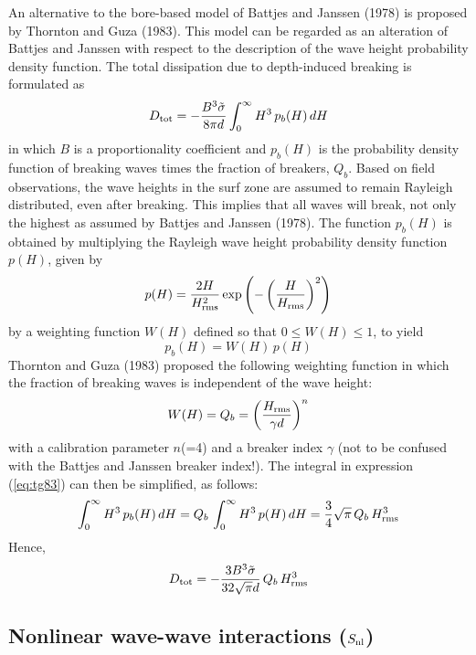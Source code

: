 \documentclass[12pt]{book}
\begin{document}
\noindent
An alternative to the bore-based model of Battjes and Janssen (1978) is proposed by Thornton and Guza (1983).
This model can be regarded as an alteration of Battjes and Janssen with respect to the description of the wave
height probability density function. The total dissipation due to depth-induced breaking is formulated as
\begin{equation}
  D_{\rm tot} = - \frac{B^3 \tilde{\sigma}}{8 \pi d} \int_{0}^{\infty} H^3 \, p_b(H)\,dH
  \label{eq:tg83}
\end{equation}
in which $B$ is a proportionality coefficient and $p_b(H)$ is the probability density function of breaking
waves times the fraction of breakers, $Q_b$. Based on field observations, the wave heights in the surf zone
are assumed to remain Rayleigh distributed, even after breaking. This implies that all waves will break, not
only the highest as assumed by Battjes and Janssen (1978). The function $p_b(H)$ is obtained by multiplying
the Rayleigh wave height probability density function $p(H)$, given by
\begin{equation}
  p(H) = \frac{2H}{H^2_{\rm rms}}\exp \left( - \left( \frac{H}{H_{\rm rms}} \right)^2 \right)
\end{equation}
by a weighting function $W(H)$ defined so that $0 \leq W(H) \leq 1$, to yield
\begin{equation}
  p_b(H) = W(H)\,p(H)
\end{equation}
Thornton and Guza (1983) proposed the following weighting function in which the fraction of breaking waves
is independent of the wave height:
\begin{equation}
  W(H) = Q_b = \left( \frac{H_{\rm rms}}{\gamma d} \right)^n
\end{equation}
with a calibration parameter $n$(=4) and a breaker index $\gamma$ (not to be confused with the Battjes and Janssen breaker index!).
The integral in expression (\ref{eq:tg83}) can then be simplified, as follows:
\begin{equation}
  \int_{0}^{\infty} H^3 \, p_b(H)\,dH = Q_b\,\int_{0}^{\infty} H^3 \, p(H)\,dH = \frac{3}{4}\sqrt{\pi}\,Q_b\,H^3_{\rm rms}
\end{equation}
Hence,
\begin{equation}
  D_{\rm tot} = - \frac{3 B^3 \tilde{\sigma}}{32 \sqrt{\pi} d} \, Q_b\, H^3_{\rm rms}
  \label{eq:tg83_2}
\end{equation}

\subsection{Nonlinear wave-wave interactions ($S_{\rm nl}$)} \label{sec:waveint}
\end{document}
